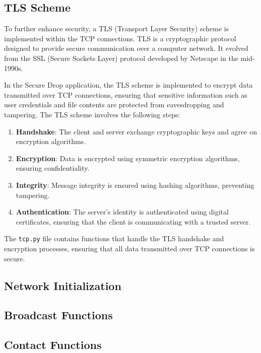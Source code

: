 \documentclass[12pt]{article}
\begin{document}
\subsection{TLS Scheme}
To further enhance security, a TLS (Transport Layer Security) scheme is implemented within the TCP connections. TLS is a cryptographic protocol designed to provide secure communication over a computer network. It evolved from the SSL (Secure Sockets Layer) protocol developed by Netscape in the mid-1990s.

In the Secure Drop application, the TLS scheme is implemented to encrypt data transmitted over TCP connections, ensuring that sensitive information such as user credentials and file contents are protected from eavesdropping and tampering. The TLS scheme involves the following steps:
\begin{enumerate}
    \item \textbf{Handshake}: The client and server exchange cryptographic keys and agree on encryption algorithms.
    \item \textbf{Encryption}: Data is encrypted using symmetric encryption algorithms, ensuring confidentiality.
    \item \textbf{Integrity}: Message integrity is ensured using hashing algorithms, preventing tampering.
    \item \textbf{Authentication}: The server's identity is authenticated using digital certificates, ensuring that the client is communicating with a trusted server.
\end{enumerate}

The \texttt{tcp.py} file contains functions that handle the TLS handshake and encryption processes, ensuring that all data transmitted over TCP connections is secure.


\subsection{Network Initialization}


\subsection{Broadcast Functions}


\subsection{Contact Functions}

\end{document}
